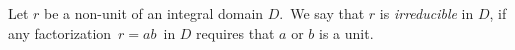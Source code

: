 \documentclass[12pt]{article}
\begin{document}
Let $r$ be a non-unit of an integral domain $D$. \,We say that $r$ is \emph{irreducible} in $D$, if any factorization \,$r = ab$\, in $D$ requires that $a$ or $b$ is a unit.
\end{document}
